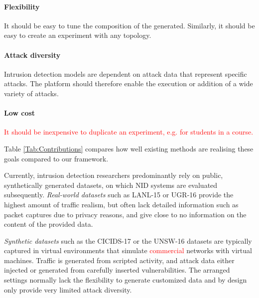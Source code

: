 \documentclass{article}
\begin{document}
\paragraph{Flexibility} It should be easy to tune the composition of the generated. Similarly, it should be easy to create an experiment with any topology.

\paragraph{Attack diversity} Intrusion detection models are dependent on attack data that represent specific attacks. The platform should therefore enable the execution or addition of a wide variety of attacks.


\paragraph{Low cost} \textcolor{red}{It should be inexpensive to duplicate an experiment, e.g. for students in a course.}


\vspace{0.3cm}

Table \ref{Tab:Contributions} compares how well existing methods are realising these goals compared to our framework.


Currently, intrusion detection researchers predominantly rely on public, synthetically generated datasets, on which NID systems are evaluated subsequently.
\textit{Real-world datasets} such as LANL-15 \cite{kent-2015-cyberdata1} or UGR-16 \cite{macia2018ugr} provide the highest amount of traffic realism, but often lack detailed information such as packet captures due to privacy reasons, and give close to no information on the content of the provided data. 

\textit{Synthetic datasets} such as the CICIDS-17 \cite{sharafaldin2018towards} or the UNSW-16  \cite{moustafa2015unsw} datasets are typically captured in virtual environments that simulate \textcolor{red}{commercial} networks with virtual machines. Traffic is generated from scripted activity, and attack data either injected or generated from carefully inserted vulnerabilities. The arranged settings normally lack the flexibility to generate customized data and by design only provide very limited attack diversity.
\end{document}
